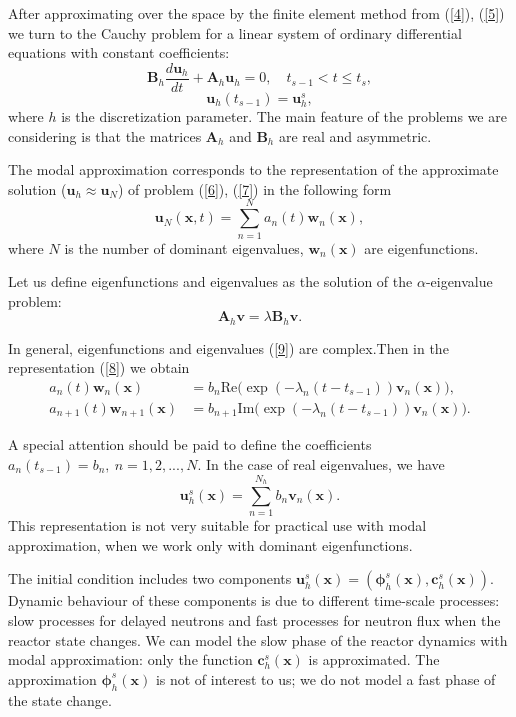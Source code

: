 \documentclass[a4paper]{jpconf}
\begin{document}
After approximating over the space by the finite element method from (\ref{4}), (\ref{5}) 
we turn to the Cauchy problem for a linear system of ordinary differential equations with constant coefficients:
\begin{equation}\label{6}
 \bm B_h \frac{d \bm u_h}{d t} + \bm A_h \bm u_h = 0,
 \quad t_{s-1} < t \leq t_s,
\end{equation}   
\begin{equation}\label{7}
 \bm u_h(t_{s-1}) = \bm u_h^s ,
\end{equation} 
where $h$ is the discretization parameter. The main feature of the problems we are considering is that the matrices $\bm A_h$ and $\bm B_h$ 
are real and asymmetric.

The modal approximation corresponds to the representation of the approximate solution  ($\bm u_h \approx \bm u_N$) of problem   (\ref{6}), (\ref{7}) in the following form
\begin{equation}\label{8}
 \bm u_N(\bm x, t) =
 \sum_{n=1}^{N} a_n(t) \bm w_n(\bm x),
\end{equation} 
where $N$ is the number of dominant eigenvalues, 
$\bm w_n(\bm x)$ are eigenfunctions.

Let us define eigenfunctions and eigenvalues as the solution of the  $\alpha$-eigenvalue problem:
\begin{equation}\label{9}
 \bm A_h \bm v = \lambda  \bm B_h \bm v .
\end{equation} 

In general, eigenfunctions and eigenvalues  (\ref{9}) are complex.Then in the representation  (\ref{8}) we obtain
\[
\begin{split}
 a_n(t) \bm w_n(\bm x) & = b_n \mathrm{Re} \big ( \exp(-\lambda_n (t-t_{s-1})) \bm v_n(\bm x) \big ), \\
 a_{n+1}(t) \bm w_{n+1}(\bm x) & = b_{n+1} \mathrm{Im} \big ( \exp(-\lambda_n (t-t_{s-1})) \bm v_n(\bm x) \big ) .
\end{split}
\] 

A special attention should be paid to define the coefficients $a_n(t_{s-1}) = b_n, \ n = 1,2, ..., N$.
In the case of real eigenvalues, we have
\[
 \bm u_h^s (\bm x) = \sum_{n=1}^{N_h} b_n \bm v_n(\bm x) .
\] 
This representation is not very suitable for practical use with modal approximation, when we work only with dominant eigenfunctions.  

The initial condition includes two components  $\bm u_h^s (\bm x) = (\bm \phi_h^s (\bm x), \bm c_h^s (\bm x))$.
Dynamic behaviour of these components is due to different time-scale processes: slow processes for delayed neutrons and fast processes for neutron flux when the reactor state changes. We can model the slow phase of the reactor dynamics with modal approximation: only the function  $\bm c_h^s (\bm x)$ is approximated. The approximation  $\bm \phi_h^s (\bm x)$ is not of interest to us; we do not model a fast phase of the state change.
\end{document}
